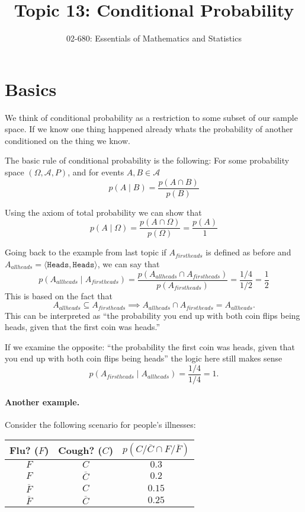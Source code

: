 

\title{Topic 13: Conditional Probability}
\author{02-680: Essentials of Mathematics and Statistics}


\maketitle

\section{Basics}
We think of conditional probability as a restriction to some subset of our sample space. 
If we know one thing happened already whats the probability of another conditioned on the thing we know. 

The basic rule of conditional probability is the following:
For some probability space $(\Omega, \mathcal{A}, P)$, and for events $A,B\in\mathcal{A}$
\[p(A\mid B) = \frac{p(A\cap B)}{p(B)}\]

Using the axiom of total probability we can show that 
\[p(A \mid \Omega) = \frac{p(A \cap \Omega)}{p(\Omega)} = \frac{p(A)}{1}\]

Going back to the example from last topic if $A_{firstheads}$ is defined as before and $A_{allheads}=\langle\texttt{Heads},\texttt{Heads}\rangle$,
we can say that 
\[p(A_{allheads} \mid A_{firstheads}) = \frac{p(A_{allheads} \cap A_{firstheads})}{p(A_{firstheads})} = \frac{1/4}{1/2} = \frac{1}{2}\]
This is based on the fact that \[A_{allheads} \subseteq A_{firstheads} \implies A_{allheads} \cap A_{firstheads} = A_{allheads}.\]
This can be interpreted as ``the probability you end up with both coin flips being heads, given that the first coin was heads.'' 

If we examine the opposite: 
``the probability the first coin was heads, given that you end up with both coin flips being heads'' 
the logic here still makes sense
\[p(A_{firstheads}\mid A_{allheads} ) = \frac{1/4}{1/4} = 1.\]

\paragraph{Another example.}
Consider the following scenario for people's illnesses:
\begin{center}
\begin{tabular}{c|c|c}
\textbf{Flu? ($F$)} & \textbf{Cough? ($C$)} & \textbf{$p(C/\overline{C} \cap F/\overline{F})$}\\
\hline
$F$ & $C$ & $0.3$\\
$F$ & $\overline{C}$ & $0.2$\\
$\overline{F}$ & $C$ & $0.15$\\
$\overline{F}$ & $\overline{C}$ & $0.25$\\
\end{tabular}
\end{center}

